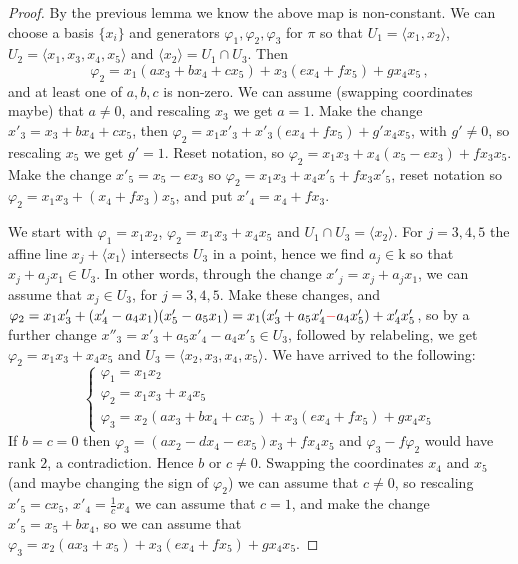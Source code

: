 \documentclass[10pt,a4paper]{amsart}
\newcommand{\f}{\varphi}
\newcommand{\kk}{\mathrm{k}}
\newcommand{\la}{\langle}
\newcommand{\ra}{\rangle}
\begin{document}
\begin{proof}
By the previous lemma we know the above map is non-constant. We can choose a basis $\{x_i\}$ and generators $\f_1, \f_2, \f_3$ for $\pi$ so that $U_1=\la x_1, x_2 \ra$, $U_2=\la x_1, x_3,x_4,x_5 \ra$ and $\la x_2 \ra= U_1 \cap U_3$. Then 
\[
\f_2=x_1(ax_3+bx_4+cx_5)+x_3(ex_4+fx_5)+gx_4x_5\,,
\]
and at least one of $a, b,c$ is non-zero. We can assume (swapping coordinates maybe) that $a \ne 0$, and rescaling $x_3$ we get $a=1$. Make the change $x'_3=x_3+bx_4+cx_5$, then $\f_2=x_1x'_3+x'_3(ex_4+fx_5)+g'x_4x_5$, with $g' \ne 0$, so rescaling $x_5$ we get $g'=1$. Reset notation, so $\f_2=x_1x_3+x_4(x_5-ex_3)+fx_3x_5$. Make the change $x'_5=x_5-ex_3$ so $\f_2=x_1x_3+x_4x'_5+fx_3x'_5$, reset notation so $\f_2=x_1x_3+(x_4+fx_3)x_5$, and put $x'_4=x_4+fx_3$. 

\item We start with $\f_1=x_1x_2$, $\f_2=x_1x_3+x_4x_5$ and $U_1\cap U_3=\la x_2 \ra$. For $j=3,4,5$ the affine line $x_j + \la x_1 \ra$ intersects $U_3$ in a point, hence we find $a_j \in \kk$ so that $x_j+a_jx_1 \in U_3$. In other words, through the change $x'_j=x_j+a_jx_1$, we can assume that $x_j \in U_3$, for $j=3,4,5$. Make these changes, and $\f_2=x_1x'_3+(x'_4-a_4x_1)(x'_5-a_5x_1)=x_1(x'_3+a_5x'_4\textcolor{red}{-}a_4x'_5)+x'_4x'_5$, so by a further change $x''_3=x'_3+a_5x'_4-a_4x'_5 \in U_3$, followed by relabeling, we get $\f_2=x_1x_3+x_4x_5$ and $U_3=\la x_2,x_3,x_4, x_5 \ra$. We have arrived to the following:
\[
\begin{cases}
    \f_1=x_1x_2 \\
    \f_2=x_1x_3+x_4x_5 \\
    \f_3=x_2(ax_3+bx_4+cx_5)+x_3(ex_4+fx_5)+gx_4x_5
\end{cases}
\]
If $b=c=0$ then $\f_3=(ax_2-dx_4-ex_5)x_3+fx_4x_5$ and $\f_3-f\f_2$ would have rank $2$, a contradiction. Hence $b$ or $c \ne 0$. Swapping the coordinates $x_4$ and $x_5$ (and maybe changing the sign of $\f_2$) we can assume that $c \ne 0$, so rescaling $x'_5=cx_5$, $x'_4=\frac1c x_4$ we can assume that $c=1$, and make the change $x'_5=x_5+bx_4$, so we can assume that $\f_3=x_2(ax_3+x_5)+x_3(ex_4+fx_5)+gx_4x_5$.


\end{proof}
\end{document}
